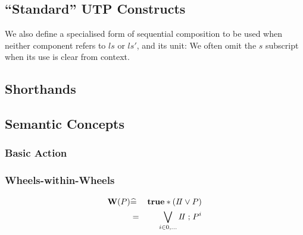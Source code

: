 \subsection{``Standard'' UTP Constructs}

We also define a specialised form of sequential composition
to be used when neither component refers to $ls$ or $ls'$,
and its unit:
We often omit the $s$ subscript when its use is clear from context.


\subsection{Shorthands}


\subsection{Semantic Concepts}

\subsubsection{Basic Action}



\subsubsection{Wheels-within-Wheels}

\begin{eqnarray*}
   \mathbf{W}(P) &\widehat=& \mathbf{true} * (I\!I \lor P)
\\         &  =  & \bigvee_{i \in 0,\dots} I\!I \mathrel{;} P^i
\end{eqnarray*}


